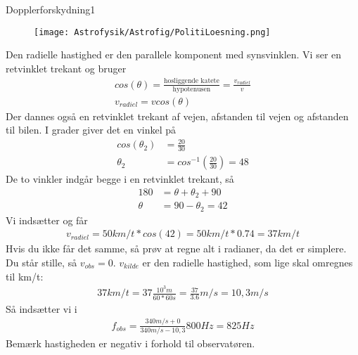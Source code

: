 \begin{opgave}{Dopplerforskydning}{1}
	\opg 
	\begin{figure}[h!]
		\centering
		\texttt{[image: Astrofysik/Astrofig/PolitiLoesning.png]}
	\end{figure}
	\opg Den radielle hastighed er den parallele komponent med synsvinklen. Vi ser en retvinklet trekant og bruger
	\begin{align}
		cos(\theta)=\frac{\text{hosliggende katete}}{\text{hypotenusen}}=\frac{v_{radiel}}{v} \\
		v_{radiel}=v cos(\theta)
	\end{align}
	Der dannes også en retvinklet trekant af vejen, afstanden til vejen og afstanden til bilen. I grader giver det en vinkel på
	\begin{align}
		cos(\theta_2)&=\frac{20}{30}\\
		\theta_2 &= cos^{-1} \left( \frac{20}{30} \right) = 48
	\end{align}
	De to vinkler indgår begge i en retvinklet trekant, så
	\begin{align}
		180 &= \theta + \theta_2 + 90\\
		\theta &= 90 - \theta_2  = 42
	\end{align}
	Vi indsætter og får
	\begin{align}
	v_{radiel}=50 km/t * cos(42) = 50 km/t * 0.74 = 37 km/t
	\end{align}
	Hvis du ikke får det samme, så prøv at regne alt i radianer, da det er simplere.
	\opg 
	Du står stille, så $v_{obs}=0$. $v_{kilde}$ er den radielle hastighed, som lige skal omregnes til km/t:
	\begin{align}
	37 km/t = 37 \frac{10^{3}m}{60*60 s} = \frac{37}{3.6} m/s = 10,3 m/s
	\end{align}
	Så indsætter vi i
	\begin{align}
	f_{obs} = \frac{340 m/s + 0}{340 m/s - 10,3} 800 Hz = 825 Hz
	\end{align}
	Bemærk hastigheden er negativ i forhold til observatøren.
\end{opgave}
